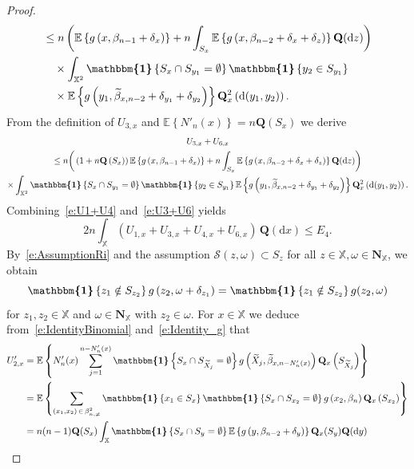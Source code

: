 \documentclass[AHL,Unicode,longabstracts]{cedram}
\newcommand*\bN{\mathbf{N}}
\newcommand{\bQ}{\mathbf{Q}}
\newcommand*\X{\mathbb{X}}
\newcommand{\E}{\mathbb{E}}
\newcommand*\cS{\mathcal{S}}
\newcommand*\md{\mathrm{d}}
\newcommand{\mean}[1] {\E\left\{{#1}\right\}}
\newcommand{\ind}{\boldsymbol{\mathbbm{1}}}
\begin{document}
\begin{proof}
\begin{align*}
& \leq n\left(\mean{g\left(x,\beta_{n-1}+\delta_x\right)} + n \int_{S_x} \mean{g\left(x,\beta_{n-2}+\delta_x+\delta_z\right)} \bQ(\md z) \right) \\
& \quad \times \int_{\X^2} \ind\left\{S_x\cap S_{y_1}=\emptyset\right\} \ind\left\{y_2\in S_{y_1}\right\}\\
&\quad \times\mean{g\left(y_1,\widetilde{\beta}_{x,n-2}+\delta_{y_1}+\delta_{y_2}\right)} \bQ^2_x\left(\md(y_1,y_2)\right).
\end{align*}
From the definition of $U_{3,x}$ and $\mean{N'_n(x)}=n \bQ(S_x)$ we derive
\begin{multline}\label{e:U3+U6}
U_{3,x}+U_{6,x}\\
\leq n\bigg(\left(1+n \bQ\left(S_x\right)\right) \mean{g\left(x,\beta_{n-1}+\delta_x\right)}
 + n \int_{S_x} \mean{g\left(x,\beta_{n-2}+\delta_x+\delta_z\right)} \bQ(\md z) \bigg) \\
 \times \int_{\X^2} \ind\left\{S_x\cap S_{y_1}=\emptyset\right\} \ind\left\{y_2\in S_{y_1}\right\}
 \mean{g\left(y_1,\widetilde{\beta}_{x,n-2}+\delta_{y_1}+\delta_{y_2}\right)} \bQ^2_x\left(\md(y_1,y_2)\right).
\end{multline}
Combining~\eqref{e:U1+U4} and~\eqref{e:U3+U6} yields
\begin{equation}\label{e:E4}
2n \int_{\X} \left(U_{1,x}+U_{3,x}+U_{4,x}+U_{6,x} \right) \, \bQ(\md x) \leq E_4.
\end{equation}
By~\eqref{e:AssumptionRi} and the assumption $\cS(z,\omega)\subset S_z$ for all $z\in \X, \omega\in\bN_{\X}$, we obtain
\begin{equation}\label{e:Identity_g}
\ind\left\{z_1\notin S_{z_2}\right\} g\left(z_2,\omega+\delta_{z_1}\right) = \ind\left\{z_1\notin S_{z_2}\right\} g(z_2,\omega)
\end{equation}
for $z_1,z_2\in\X$ and $\omega\in\bN_{\X}$ with $z_2\in\omega$. For $x\in\X$ we deduce from~\eqref{e:IdentityBinomial} and~\eqref{e:Identity_g} that
\begin{align*}
U'_{2,x} & = \mean{ N_n'(x) \sum_{j=1}^{n-N_n'(x)} \ind\left\{S_x\cap S_{\widetilde{X}_j} = \emptyset \right\} g\left(\widetilde{X}_j,\widetilde{\beta}_{x,n-N_n'(x)}\right) \bQ_x\left(S_{\widetilde{X}_j}\right)} \\
& = \mean{\sum_{\left(x_1,x_2\right)\,\in\,\beta_{n,\neq}^2} \ind\left\{x_1\in S_x\right\} \ind\left\{S_x\cap S_{x_2}=\emptyset\right\} g\left(x_2,\beta_n\right) \bQ_x\left(S_{x_2}\right)} \\
& = n(n-1) \bQ(S_x) \int_{\X} \ind\left\{S_x\cap S_y=\emptyset\right\} \mean{g\left(y,\beta_{n-2}+\delta_y\right)} \bQ_x(S_y) \bQ(\md y)

\end{align*}
\end{proof}
\end{document}
